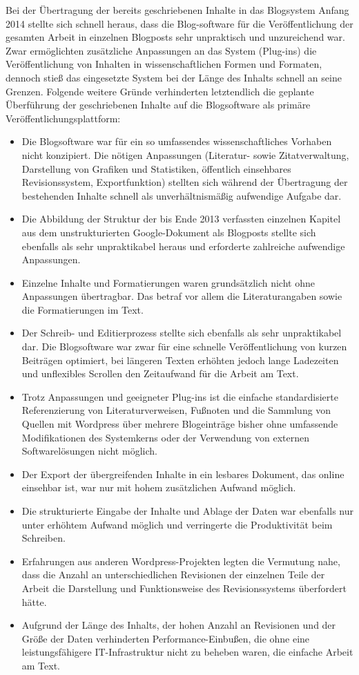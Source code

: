 Bei der Übertragung der bereits geschriebenen Inhalte in das Blogsystem Anfang 2014 stellte sich schnell heraus, dass die Blog-software für die Veröffentlichung der gesamten Arbeit in einzelnen Blogposts sehr unpraktisch und unzureichend war. Zwar ermöglichten zusätzliche Anpassungen an das System (Plug-ins) die Veröffentlichung von Inhalten in wissenschaftlichen Formen und Formaten, dennoch stieß das eingesetzte System bei der Länge des Inhalts schnell an seine Grenzen. Folgende weitere Gründe verhinderten letztendlich die geplante Überführung der geschriebenen Inhalte auf die Blogsoftware als primäre Veröffentlichungsplattform:
\begin{itemize}
\item Die Blogsoftware war für ein so umfassendes wissenschaftliches Vorhaben nicht konzipiert. Die nötigen Anpassungen (Literatur- sowie Zitatverwaltung, Darstellung von Grafiken und Statistiken, öffentlich einsehbares Revisionssystem, Exportfunktion) stellten sich während der Übertragung der bestehenden Inhalte schnell als unverhältnismäßig aufwendige Aufgabe dar.
\item Die Abbildung der Struktur der bis Ende 2013 verfassten einzelnen Kapitel aus dem unstrukturierten Google-Dokument als Blogposts stellte sich ebenfalls als sehr unpraktikabel heraus und erforderte zahlreiche aufwendige Anpassungen.
\item Einzelne Inhalte und Formatierungen waren grundsätzlich nicht ohne Anpassungen übertragbar. Das betraf vor allem die Literaturangaben sowie die Formatierungen im Text.
\item Der Schreib- und Editierprozess stellte sich ebenfalls als sehr unpraktikabel dar. Die Blogsoftware war zwar für eine schnelle Veröffentlichung von kurzen Beiträgen optimiert, bei längeren Texten erhöhten jedoch lange Ladezeiten und unflexibles Scrollen den Zeitaufwand für die Arbeit am Text.
\item Trotz Anpassungen und geeigneter Plug-ins ist die einfache standardisierte Referenzierung von Literaturverweisen, Fußnoten und die Sammlung von Quellen mit Wordpress über mehrere Blogeinträge bisher ohne umfassende Modifikationen des Systemkerns oder der Verwendung von externen Softwarelösungen nicht möglich.
\item Der Export der übergreifenden Inhalte in ein lesbares Dokument, das online einsehbar ist, war nur mit hohem zusätzlichen Aufwand möglich.
\item Die strukturierte Eingabe der Inhalte und Ablage der Daten war ebenfalls nur unter erhöhtem Aufwand möglich und verringerte die Produktivität beim Schreiben.
\item Erfahrungen aus anderen Wordpress-Projekten legten die Vermutung nahe, dass die Anzahl an unterschiedlichen Revisionen der einzelnen Teile der Arbeit die Darstellung und Funktionsweise des Revisionssystems überfordert hätte.
\item Aufgrund der Länge des Inhalts, der hohen Anzahl an Revisionen und der Größe der Daten verhinderten Performance-Einbußen, die ohne eine leistungsfähigere IT-Infrastruktur nicht zu beheben waren, die einfache Arbeit am Text.
\end{itemize}

